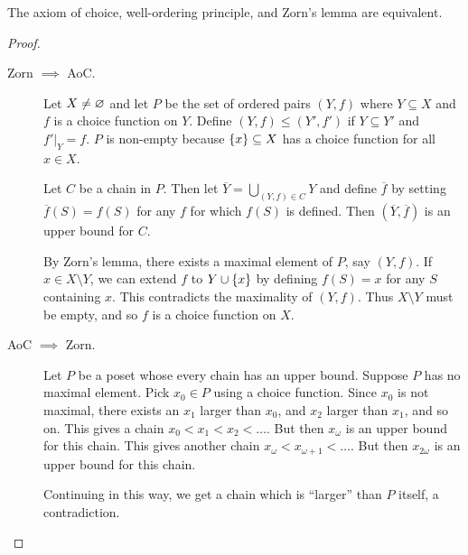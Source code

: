 \begin{fact*}
    The axiom of choice, well-ordering principle, and Zorn's lemma are
    equivalent.
\end{fact*}
\begin{proof}
    \begin{description}
        \item[Zorn $\implies$ AoC.]
            Let $X \ne \varnothing$ and let $P$ be the set of ordered pairs $(Y, f)$
            where $Y \subseteq X$ and $f$ is a choice function on $Y$.
            Define $(Y, f) \le (Y', f')$ if $Y \subseteq Y'$ and
            $f' \vert_Y = f$.
            $P$ is non-empty because $\set{x} \subseteq X$ has a choice
            function for all $x \in X$.

            Let $C$ be a chain in $P$.
            Then let $\overline{Y} = \bigcup_{(Y, f) \in C} Y$ and define
            $\overline{f}$ by setting $\overline{f}(S) = f(S)$ for any $f$
            for which $f(S)$ is defined.
            Then $(\overline{Y}, \overline{f})$ is an upper bound for $C$.

            By Zorn's lemma, there exists a maximal element of $P$, say
            $(Y, f)$.
            If $x \in X \setminus Y$, we can extend $f$ to $Y \cup \set{x}$
            by defining $f(S) = x$ for any $S$ containing $x$.
            This contradicts the maximality of $(Y, f)$.
            Thus $X \setminus Y$ must be empty, and so $f$ is a choice
            function on $X$.
        \item[AoC $\implies$ Zorn.]
            Let $P$ be a poset whose every chain has an upper bound.
            Suppose $P$ has no maximal element.
            Pick $x_0 \in P$ using a choice function.
            Since $x_0$ is not maximal, there exists an $x_1$ larger than
            $x_0$, and $x_2$ larger than $x_1$, and so on.
            This gives a chain $x_0 < x_1 < x_2 < \dots$.
            But then $x_\omega$ is an upper bound for this chain.
            This gives another chain $x_\omega < x_{\omega + 1} < \dots$.
            But then $x_{2\omega}$ is an upper bound for this chain.

            Continuing in this way, we get a chain which is ``larger'' than
            $P$ itself, a contradiction.
    \end{description}
\end{proof}
